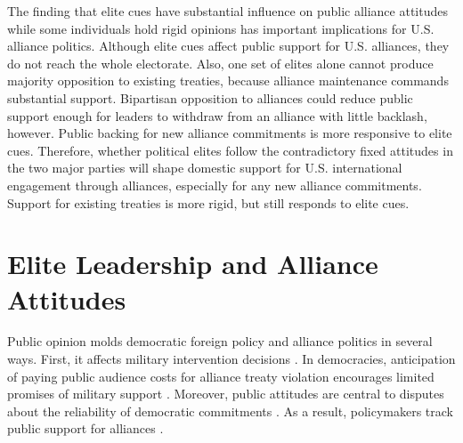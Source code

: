 \documentclass[12pt]{article}
\begin{document}
The finding that elite cues have substantial influence on public alliance attitudes while some individuals hold rigid opinions has important implications for U.S. alliance politics. 
Although elite cues affect public support for U.S. alliances, they do not reach the whole electorate.
Also, one set of elites alone cannot produce majority opposition to existing treaties, because alliance maintenance commands substantial support.
Bipartisan opposition to alliances could reduce public support enough for leaders to withdraw from an alliance with little backlash, however.  
Public backing for new alliance commitments is more responsive to elite cues. 
Therefore, whether political elites follow the contradictory fixed attitudes in the two major parties will shape domestic support for U.S. international engagement through alliances, especially for any new alliance commitments.
Support for existing treaties is more rigid, but still responds to elite cues.



\section{Elite Leadership and Alliance Attitudes}


Public opinion molds democratic foreign policy and alliance politics in several ways.
First, it affects military intervention decisions \citep{Tomzetal2020, LinGreenberg2021}. 
In democracies, anticipation of paying public audience costs for alliance treaty violation encourages limited promises of military support \citep{Chibaetal2015, FjelstulReiter2019}. 
Moreover, public attitudes are central to disputes about the reliability of democratic commitments \citep{Gaubatz1996, GartzkeGleditsch2004}. 
As a result, policymakers track public support for alliances \citep{Sayle2019}. 


%
%
\end{document}
